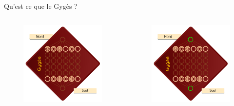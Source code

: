 \documentclass{beamer}
\begin{document}
\begin{frame}{Qu’est ce que le Gygès ?}
\begin{columns}
				 {
					\begin{figure}[h]
						\centering
						\includegraphics[width=\textwidth]{images/Gyges.png}
					\end{figure}
				} {
					\alt<5> {
						\begin{figure}[h]
							\centering
							\includegraphics[width=\textwidth]{images/Bases.png}

\end{figure}}}
\end{columns}
\end{frame}
\end{document}

